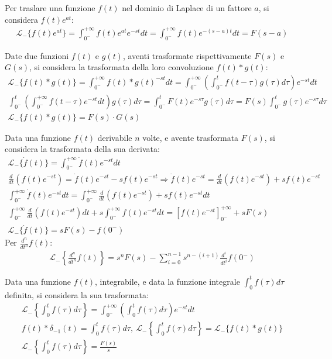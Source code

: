 \documentclass{article}
\numberwithin{equation}{subsection}
\begin{document}
Per traslare una funzione $f(t)$ nel dominio di Laplace di un fattore $a$, si considera $f(t)e^{at}$:
\begin{gather}
    \mathscr{L}_-\{f(t)e^{at}\}=\displaystyle\int_{0^-}^{+\infty}f(t)e^{at}e^{-st}dt=\int_{0^-}^{+\infty}f(t)e^{-(s-a)t}dt=F(s-a)
\end{gather}

Date due funzioni $f(t)$ e $g(t)$, aventi trasformate rispettivamente $F(s)$ e $G(s)$, si considera la trasformata della loro convoluzione $f(t)*g(t)$:
\begin{gather}
    \mathscr{L}_-\{f(t)*g(t)\}=\displaystyle\int_{0^-}^{+\infty}f(t)*g(t)^{-st}dt=\int_{0^-}^{+\infty}\left(\int_{0^-}^{t}f(t-\tau)g(\tau)d\tau\right)e^{-st} dt\\
    \displaystyle\int_{0^-}^{t}\left(\int_{0^-}^{+\infty}f(t-\tau)e^{-st}dt\right)g(\tau)d\tau=\int_{0^-}^{t}F(t)e^{-s\tau}g(\tau)d\tau=F(s)\int_{0^-}^{t}g(\tau)e^{-s\tau}d\tau\\
    \mathscr{L}_-\{f(t)*g(t)\}=F(s)\cdot G(s)
\end{gather}

Data una funzione $f(t)$ derivabile $n$ volte, e avente trasformata $F(s)$, si considera la trasformata della sua derivata:
\begin{gather}
    \mathscr{L}_-\{\dot f(t)\}=\displaystyle\int_{0^-}^{+\infty}\dot f(t)e^{-st}dt\\
    \displaystyle\frac{d}{dt}(f(t)e^{-st})=\dot f(t)e^{-st}-sf(t)e^{-st}\Rightarrow\dot f(t)e^{-st}=\frac{d}{dt}(f(t)e^{-st})+sf(t)e^{-st}\\
    \displaystyle\int_{0^-}^{+\infty}\dot f(t)e^{-st}dt=\int_{0^-}^{+\infty}\frac{d}{dt}(f(t)e^{-st})+sf(t)e^{-st}dt\\
    \displaystyle\int_{0^-}^{+\infty}\frac{d}{dt}(f(t)e^{-st})dt+s\int_{0^-}^{+\infty}f(t)e^{-st}dt=\left[f(t)e^{-st}\right]^{+\infty}_{0^-}+sF(s)\\
    \mathscr{L}_-\{\dot f(t)\}=sF(s)-f(0^-)
\end{gather}
Per $\displaystyle\frac{d^n}{dt^n}f(t)$:
\begin{gather}
    \mathscr{L}_-\left\{\displaystyle\frac{d^n}{dt^n}f(t)\right\}=s^nF(s)-\sum_{i=0}^{n-1}s^{n-(i+1)}\frac{d^i}{dt^i}f(0^-)
\end{gather}

Data una funzione $f(t)$, integrabile, e data la funzione integrale $\displaystyle\int_{0}^{t}f(\tau)d\tau$ definita, si considera la sua trasformata:
\begin{gather}
    \mathscr{L}_-\left\{\displaystyle\int_{0}^{t}f(\tau)d\tau\right\}=\int_{0^-}^{+\infty}\left(\int_{0}^{t}f(\tau)d\tau\right)e^{-st}dt\\
    f(t)*\delta_{-1}(t)=\displaystyle\int_{0}^{t}f(\tau)d\tau,\:\mathscr{L}_-\left\{\displaystyle\int_{0}^{t}f(\tau)d\tau\right\}=\mathscr{L}_-\{f(t)*g(t)\}\\
    \mathscr{L}_-\left\{\displaystyle\int_{0}^{t}f(\tau)d\tau\right\}=\frac{F(s)}{s}
\end{gather}
\end{document}
